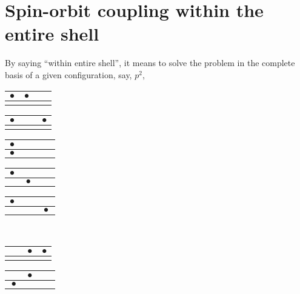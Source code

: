 \section{Spin-orbit coupling within the entire shell}
By saying ``within entire shell'', it means to solve the problem in the complete basis
of a given configuration, say, $p^2$,
\begin{center}
\vspace{-0.5em}
\begin{tabular}{|c|c|c|}
\hline
$\bullet$ & $\bullet$ & $\phantom{\bullet}$ \\ \hline
 &  &  \\
\hline
\end{tabular}
\begin{tabular}{|c|c|c|}
\hline
$\bullet$ & $\phantom{\bullet}$ & $\bullet$ \\ \hline
 &  &  \\
\hline
\end{tabular}
\begin{tabular}{|c|c|c|}
\hline
$\bullet$ & $\phantom{\bullet}$ & $\phantom{\bullet}$ \\ \hline
$\bullet$ &  &  \\
\hline
\end{tabular}
\begin{tabular}{|c|c|c|}
\hline
$\bullet$ & $\phantom{\bullet}$ & $\phantom{\bullet}$ \\ \hline
 & $\bullet$ &  \\
\hline
\end{tabular}
\begin{tabular}{|c|c|c|}
\hline
$\bullet$ & $\phantom{\bullet}$ & $\phantom{\bullet}$ \\ \hline
 &  & $\bullet$ \\
\hline
\end{tabular} \\
\vspace{0.5em}
\begin{tabular}{|c|c|c|}
\hline
$\phantom{\bullet}$ & $\bullet$ & $\bullet$ \\ \hline
 &  &  \\
\hline
\end{tabular}
\begin{tabular}{|c|c|c|}
\hline
$\phantom{\bullet}$ & $\bullet$ & $\phantom{\bullet}$ \\ \hline
$\bullet$ &  &  \\
\hline
\end{tabular}
\begin{tabular}{|c|c|c|}

\end{tabular}
\end{center}
